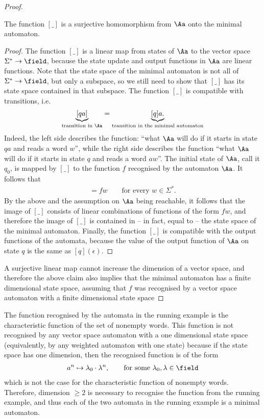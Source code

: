 \begin{proof}
\begin{claim}
	The function $[\_]$ is a surjective  homomorphism  from $\Aa$ onto  the minimal automaton. 
\end{claim}
\begin{proof}
The function $[\_]$ is a linear map from states of $\Aa$ to the vector space $\Sigma^* \to \field$, because the state update and output functions in $\Aa$ are linear functions. Note that the state space of the minimal automaton is not all of $\Sigma^* \to \field$, but only a subspace, so we still need to show that $[\_]$ has its state space contained in that subspace.  The function $[\_]$ is compatible with transitions, i.e.~
\begin{align*}
  \underbrace{[qa]}_{\text{transition in $\Aa$}} = \underbrace{[q]a.}_{\text{transition in the minimal automaton}}
\end{align*}
Indeed, the left side describes the function: ``what $\Aa$ will do if it starts in state $qa$ and reads a word $w$'', while the right side describes the function ``what $\Aa$ will do if it starts in state $q$ and reads a word $aw$''.
The initial state of $\Aa$, call it $q_0$,  is mapped by $[\_]$ to the function $f$ recognised by the automaton $\Aa$. It follows that 
\begin{align*}
[q_0	w] = fw \qquad \text{for every }w \in \Sigma^*.
\end{align*}
By the above and the  assumption on $\Aa$ being reachable,  it follows that the image of  $[\_]$ consists of  linear combinations of functions of the form $fw$, and therefore the image of $[\_]$ is contained in -- in fact, equal to -- the state space of the minimal automaton. Finally, the function $[\_]$ is compatible with the output functions of the automata, because the value of the output function of $\Aa$ on state $q$ is the same as $[q](\epsilon)$.  
\end{proof}

A surjective linear map cannot increase the dimension of a vector space, and therefore the above claim also implies that the minimal automaton has a finite dimensional state space, assuming that $f$ was recognised by a vector space automaton with a finite dimensional state space
\end{proof}

\begin{example} The function recognised by the automata in the running example is the characteristic function of the set of nonempty words. This function is not recognised by any vector space automaton with a one dimensional state space (equivalently, by any weighted automaton with one state) because if the state space has one dimension, then the recognised function is of the form
\begin{align*}
  a^n \mapsto   \lambda_0 \cdot \lambda^n, \qquad \text{for some $\lambda_0,\lambda \in \field$}
\end{align*}
which is not the case for the characteristic function of nonempty words. Therefore, dimension $\ge 2$ is  necessary to recognise the function from the running example, and thus each of the two automata in the running example is a minimal automaton.
\end{example}

